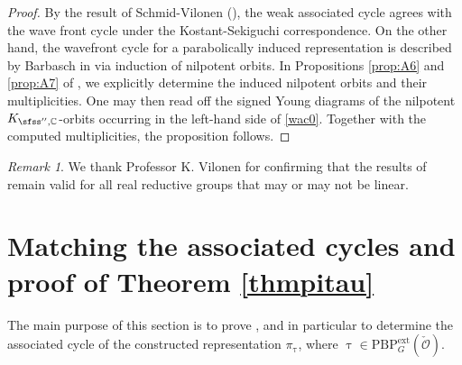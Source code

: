 \documentclass[11pt,a4paper]{amsart}
\newcommand{\CO}{{\mathcal {O}}}
\numberwithin{equation}{section}
\theoremstyle{remark}
\newtheorem*{remark}{Remark}
\def\PBP{\mathrm{PBP}}
\begin{document}
\begin{proof}
By the result of Schmid-Vilonen (\cite{SV}),  the weak associated cycle agrees with the wave
front cycle under the Kostant-Sekiguchi
correspondence.  On the other hand, the wavefront cycle for a parabolically induced representation is described by Barbasch in \cite[Corollary~5.0.10]{B.Orbit} via induction of nilpotent orbits. In Propositions \ref{prop:A6} and \ref{prop:A7} of , we  explicitly determine the induced nilpotent orbits and their multiplicities. One may then read off the signed Young diagrams of the nilpotent $K_{\sfss'',\C}$-orbits occurring in the left-hand side of \eqref{wac0}.  Together with the computed multiplicities, the proposition follows. %
\end{proof}

 

\begin{remark} We thank Professor K. Vilonen for confirming that the results of \cite{SV} remain valid for all real reductive groups that may or may not be linear.%
\end{remark}


\section{Matching the associated  cycles and proof of Theorem \ref{thmpitau}}\label{sec:equac}

The main purpose of this section is to prove , and in particular to determine the associated cycle of the constructed representation $\pi _{\uptau}$, where 
$\uptau \in \mathrm{\PBP}^{\mathrm{ext}}_{G}(\check \CO)$. 
\end{document}
